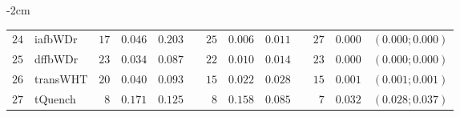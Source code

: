 \begin{table*}[!htbp]
\begin{adjustwidth*}{}{-2cm}
\begin{tabular}{@{}rlrrrrrrrrrcc@{}}
\footnotesize{$24$} & \footnotesize{iafbWDr  } & \footnotesize{$17$} & \footnotesize{$0.046$} & \footnotesize{$0.203$} && \footnotesize{$25$} & \footnotesize{$0.006$} & \footnotesize{$0.011$} && \footnotesize{$27$} & \footnotesize{$0.000$} & \footnotesize{$(0.000;0.000)$} \\
\footnotesize{$25$} & \footnotesize{dffbWDr  } & \footnotesize{$23$} & \footnotesize{$0.034$} & \footnotesize{$0.087$} && \footnotesize{$22$} & \footnotesize{$0.010$} & \footnotesize{$0.014$} && \footnotesize{$23$} & \footnotesize{$0.000$} & \footnotesize{$(0.000;0.000)$} \\
\footnotesize{$26$} & \footnotesize{transWHT } & \footnotesize{$20$} & \footnotesize{$0.040$} & \footnotesize{$0.093$} && \footnotesize{$15$} & \footnotesize{$0.022$} & \footnotesize{$0.028$} && \footnotesize{$15$} & \footnotesize{$0.001$} & \footnotesize{$(0.001;0.001)$} \\
\footnotesize{$27$} & \footnotesize{tQuench  } & \footnotesize{$8 $} & \footnotesize{$0.171$} & \footnotesize{$0.125$} && \footnotesize{$8 $} & \footnotesize{$0.158$} & \footnotesize{$0.085$} && \footnotesize{$7 $} & \footnotesize{$0.032$} & \footnotesize{$(0.028;0.037)$} \\
\bottomrule
\end{tabular}
\end{adjustwidth*}
\end{table*}

